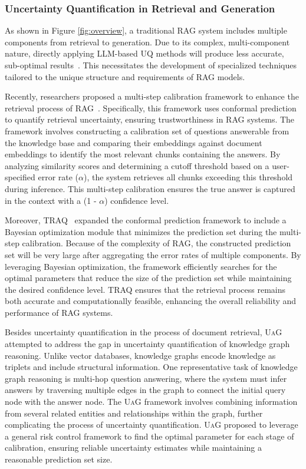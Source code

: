 \subsubsection{Uncertainty Quantification in Retrieval and Generation}
As shown in Figure \ref{fig:overview}, a traditional RAG system includes multiple components from retrieval to generation. Due to its complex, multi-component nature, directly applying LLM-based UQ methods
will produce less accurate, sub-optimal results~\cite{li2023traq, rouzrokh2024conflare}. This necessitates the
development of specialized techniques tailored to the unique structure and
requirements of RAG models. 

Recently, researchers proposed a multi-step calibration framework to enhance the retrieval process of RAG~\cite{rouzrokh2024conflare}. Specifically, this framework uses conformal prediction to quantify retrieval uncertainty, ensuring trustworthiness in RAG systems. The framework involves constructing a calibration set of questions answerable from the knowledge base and comparing their embeddings against document embeddings to identify the most relevant chunks containing the answers. By analyzing similarity scores and determining a cutoff threshold based on a user-specified error rate ($\alpha$), the system retrieves all chunks exceeding this threshold during inference. This multi-step calibration ensures the true answer is captured in the context with a (1 - $\alpha$) confidence level. 

Moreover, TRAQ~\cite{li2023traq} expanded the conformal prediction framework to include a Bayesian optimization module that minimizes the prediction set during the multi-step calibration. Because of the complexity of RAG, the constructed prediction set will be very large after aggregating the error rates of multiple components. By leveraging Bayesian optimization, the framework efficiently searches for the optimal parameters that reduce the size of the prediction set while maintaining the desired confidence level. TRAQ ensures that the retrieval process remains both accurate and computationally feasible, enhancing the overall reliability and performance of RAG systems.

Besides uncertainty quantification in the process of document retrieval, \textsc{UaG}~\cite{ni2024trustworthyknowledgegraphreasoning} attempted to address the gap in uncertainty quantification of knowledge graph reasoning. Unlike vector databases, knowledge graphs encode knowledge as triplets and include structural information. One representative task of knowledge graph reasoning is multi-hop question answering, where the system must infer answers by traversing multiple edges in the graph to connect the initial query node with the answer node. The \textsc{UaG} framework involves combining information from several related entities and relationships within the graph, further complicating the process of uncertainty quantification. \textsc{UaG} proposed to leverage a general risk control framework to find the optimal parameter for each stage of calibration, ensuring reliable uncertainty estimates while maintaining a reasonable prediction set size. 



